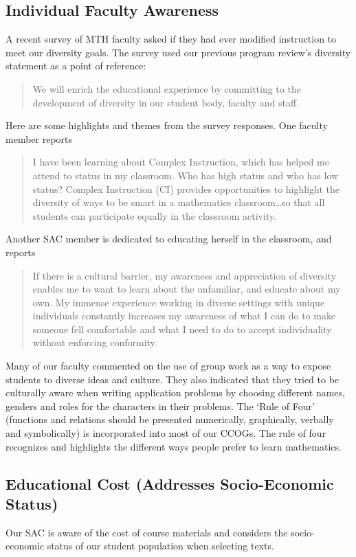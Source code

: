 \subsection{Individual Faculty Awareness}
A recent survey of MTH faculty asked if they had ever modified instruction to
meet our diversity goals. The survey used our previous program review's
diversity statement as a point of reference:
\begin{quote}
    We will enrich the educational experience by committing to the development
    of diversity in our student body, faculty and staff.
\end{quote}
Here are some highlights and themes from the survey responses. One faculty
member reports 
\begin{quote}
    I have been learning about Complex Instruction, which has helped me attend
    to status in my classroom. Who has high status and who has low status?
    Complex Instruction (CI) provides opportunities to highlight the diversity
    of ways to be smart in a mathematics classroom\ldots so that all students
    can participate equally in the classroom activity.
\end{quote}
Another SAC member is dedicated to educating herself in the classroom, and
reports
\begin{quote}
    If there is a cultural barrier, my awareness and appreciation of diversity
    enables me to want to learn about the unfamiliar, and educate about my own.
    My immense experience working in diverse settings with unique individuals
    constantly increases my awareness of what I can do to make someone fell
    comfortable and what I need to do to accept individuality without enforcing
    conformity.
\end{quote}
Many of our faculty commented on the use of group work as a way to expose
students to diverse ideas and culture.  They also indicated that they tried to
be culturally aware when writing application problems by choosing different
names, genders and roles for the characters in their problems. The `Rule of
Four' (functions and relations should be presented numerically, graphically,
verbally and symbolically) is incorporated into most of our CCOGs. The rule of
four recognizes and highlights the different ways people prefer to learn
mathematics.
\subsection{Educational Cost (Addresses Socio-Economic Status)}
Our SAC is aware of the cost of course materials and considers the
socio-economic status of our student population when selecting texts. 

